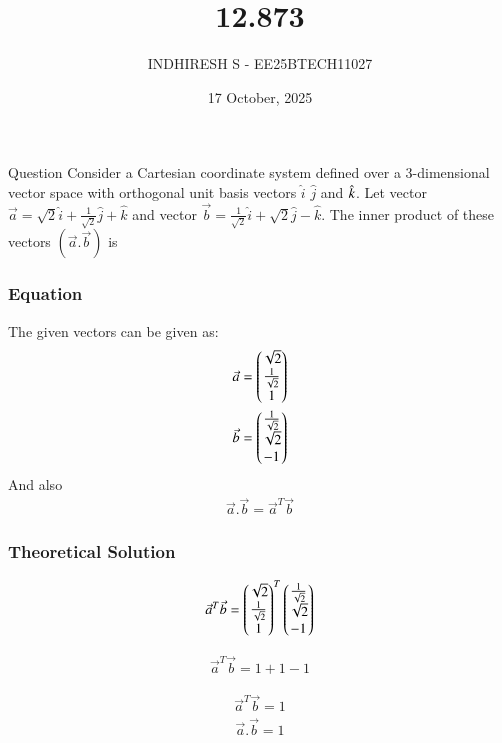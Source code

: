 \documentclass{beamer}
\title %
    {12.873}
\date{17 October, 2025}
\author %
    {INDHIRESH S - EE25BTECH11027}
\begin{document}
    
    \frame{\titlepage}
    
    \begin{frame}{Question}
 Consider a Cartesian coordinate system defined over a 3-dimensional vector space with orthogonal unit basis vectors $\hat{i}$
$\hat{j}$ and $\Hat{k}$. Let vector $\Vec{a}=\sqrt{2}\hat{i}+\frac{1}{\sqrt{2}}\hat{j}+\hat{k}$ and
vector $\Vec{b}=\frac{1}{\sqrt{2}}\hat{i}+\sqrt{2}\hat{j}-\hat{k}$. The inner product of these vectors $(\Vec{a}.\Vec{b})$ is
    \end{frame}
    
    \begin{frame}[allowframebreaks] 
    \frametitle{Equation}
        \centering
        \label{tab:parameters}
 The given vectors can be given as:
\begin{align}
 \Vec{a}=\begin{pmatrix}\sqrt{2}\\\frac{1}{\sqrt{2}}\\1\end{pmatrix}\\
 \Vec{b}=\begin{pmatrix}\frac{1}{\sqrt{2}}\\\sqrt{2}\\-1\end{pmatrix}
\end{align}
And also
\begin{align}
\Vec{a}.\Vec{b}=\Vec{a}^T\Vec{b}
\end{align}

    \end{frame}
    
    \begin{frame}
    \frametitle{Theoretical Solution}
  \begin{align}
 \Vec{a}^T\Vec{b}=\begin{pmatrix}\sqrt{2}\\\frac{1}{\sqrt{2}}\\1\end{pmatrix}^T\begin{pmatrix}\frac{1}{\sqrt{2}}\\\sqrt{2}\\-1\end{pmatrix}
\end{align}

\begin{align}
    \Vec{a}^T\Vec{b}=1+1-1
\end{align}

\begin{align}
 \Vec{a}^T\Vec{b}=1
\end{align}
\begin{align}
    \Vec{a}.\Vec{b}=1
\end{align}
    \end{frame}
    
    
\end{document}
